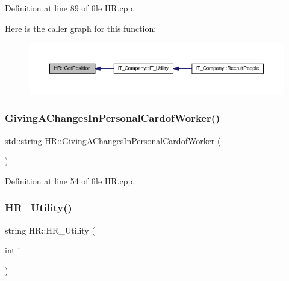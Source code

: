 Definition at line 89 of file H\+R.\+cpp.

Here is the caller graph for this function\+:
\nopagebreak
\begin{figure}[H]
\begin{center}
\leavevmode
\includegraphics[width=350pt]{class_h_r_aed5b4581248646ba06467442b080c262_icgraph}
\end{center}
\end{figure}
\mbox{\label{class_h_r_ad794de5aee2a01b9ac3d5f22d435afba}} 
\subsubsection{\texorpdfstring{Giving\+A\+Changes\+In\+Personal\+Cardof\+Worker()}{GivingAChangesInPersonalCardofWorker()}}
{\footnotesize\ttfamily std\+::string H\+R\+::\+Giving\+A\+Changes\+In\+Personal\+Cardof\+Worker (\begin{DoxyParamCaption}{ }\end{DoxyParamCaption})}



Definition at line 54 of file H\+R.\+cpp.

\mbox{\label{class_h_r_a55cb339b18d5eac3fb3a7a9a260d5f98}} 
\subsubsection{\texorpdfstring{H\+R\+\_\+\+Utility()}{HR\_Utility()}}
{\footnotesize\ttfamily string H\+R\+::\+H\+R\+\_\+\+Utility (\begin{DoxyParamCaption}\item[{int}]{i }\end{DoxyParamCaption})\hspace{0.3cm}{\ttfamily [private]}}



